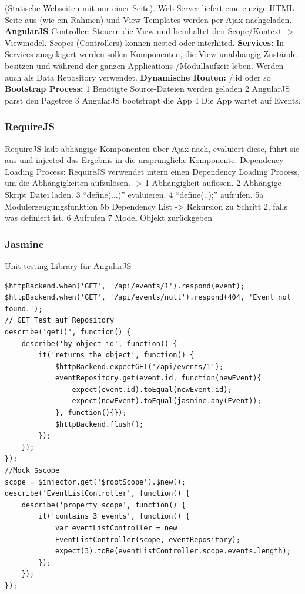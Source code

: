 \begin{multicols*}{4}
(Statische Webseiten mit nur einer Seite). 
Web Server liefert eine einzige HTML-Seite aus (wie ein Rahmen) 
und View Templates werden per Ajax nachgeladen.
\textbf{\color{NavyBlue}AngularJS} Controller: Steuern die View und beinhaltet den Scope/Kontext -> 
Viewmodel. Scopes (Controllers) können nested oder interhited.
\textbf{\color{NavyBlue}Services:} In Services ausgelagert werden sollen Komponenten, die 
View-unabhängig Zustände besitzen und 
während der ganzen Applications-/Modullaufzeit leben. Werden auch als Data Repository verwendet.
\textbf{\color{NavyBlue}Dynamische Routen:} /:id oder so
\textbf{\color{NavyBlue}Bootstrap Process:} 1 Benötigte Source-Dateien werden geladen 2 AngularJS parst den 
Pagetree 3 AngularJS bootstrapt die App 4 Die App wartet auf Events.
\subsubsection{RequireJS}
RequireJS lädt abhängige Komponenten über Ajax nach, evaluiert
diese, führt sie aus und injected das
Ergebnis in die ursprüngliche Komponente.
Dependency Loading Process: RequireJS verwendet intern einen Dependency Loading Process, 
um die Abhängigkeiten aufzulösen. -> 1 Abhängigkeit auflösen. 
2 Abhängige Skript Datei laden. 3 “define(...)” evaluieren. 4 “define(..);” aufrufen. 5a Modulerzeugungsfunktion 
5b Dependency List -> Rekursion zu Schritt 2, falls was definiert ist. 6 Aufrufen 7 Model Objekt zurückgeben
\subsubsection{Jasmine}
Unit testing Library für AngularJS
 \begin{verbatim}
$httpBackend.when('GET', '/api/events/1').respond(event);
$httpBackend.when('GET', '/api/events/null').respond(404, 'Event not found.');
// GET Test auf Repository
describe('get()', function() {
	describe('by object id', function() {
		it('returns the object', function() {
			$httpBackend.expectGET('/api/events/1');
			eventRepository.get(event.id, function(newEvent){
				expect(event.id).toEqual(newEvent.id);
				expect(newEvent).toEqual(jasmine.any(Event));
			}, function(){});
			$httpBackend.flush();
		});
	});
});
//Mock $scope
scope = $injector.get('$rootScope').$new();
describe('EventListController', function() {
	describe('property scope', function() {
		it('contains 3 events', function() {
			var eventListController = new 
			EventListController(scope, eventRepository);
			expect(3).toBe(eventListController.scope.events.length);
		});
	});
});
 \end{verbatim}


\end{multicols*}
